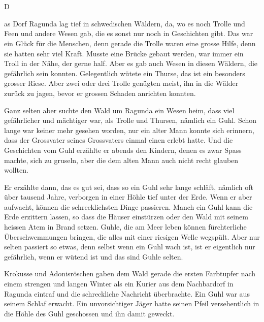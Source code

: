 \chapter*{}
\lettrine[lines=3]{\color{DeepPink}D}{}\begin{swb}as Dorf Ragunda lag tief in schwedischen Wäldern, da, wo es noch Trolle und Feen und andere Wesen gab, die es sonst nur noch in Geschichten gibt. Das war ein Glück für die Menschen, denn gerade die Trolle waren eine grosse Hilfe, denn sie hatten sehr viel Kraft. Musste eine Brücke gebaut werden, war immer ein Troll in der Nähe, der gerne half. Aber es gab auch Wesen in diesen Wäldern, die gefährlich sein konnten. Gelegentlich wütete ein Thurse, das ist ein besonders grosser Riese. Aber zwei oder drei Trolle genügten meist, ihn in die Wälder zurück zu jagen, bevor er grossen Schaden anrichten konnten. 
    
Ganz selten aber suchte den Wald um Ragunda ein Wesen heim, dass viel gefährlicher und mächtiger war, als Trolle und Thursen, nämlich ein Guhl. Schon lange war keiner mehr gesehen worden, nur ein alter Mann konnte sich erinnern, dass der Grossvater seines Grossvaters einmal einen erlebt hatte. Und die Geschichten vom Guhl  erzählte er abends den Kindern, denen es zwar Spass machte, sich zu gruseln, aber die dem alten Mann auch nicht recht glauben wollten. 

Er erzählte dann, das es gut sei, dass so ein Guhl sehr lange schläft, nämlich oft über tausend Jahre, verborgen in einer Höhle tief unter der Erde. Wenn er aber aufwacht, können die schrecklichsten Dinge passieren. Manch ein Guhl kann die Erde erzittern lassen, so dass die Häuser einstürzen oder den Wald mit seinem heissen Atem in Brand setzen. Guhle, die am Meer leben können fürchterliche Überschwemmungen bringen, die alles mit einer riesigen Welle wegspült. Aber nur selten passiert so etwas, denn selbst wenn ein Guhl wach ist, ist er eigentlich nur gefährlich, wenn er wütend ist und das sind Guhle selten.

Krokusse und Adonisröschen gaben dem Wald gerade die ersten Farbtupfer nach einem strengen  und langen Winter als ein Kurier aus dem Nachbardorf in Ragunda eintraf und die schreckliche Nachricht überbrachte. Ein Guhl war aus seinem Schlaf erwacht. Ein unvorsichtiger Jäger hatte seinen Pfeil versehentlich in die Höhle des Guhl geschossen und ihn damit geweckt.



\end{swb}
